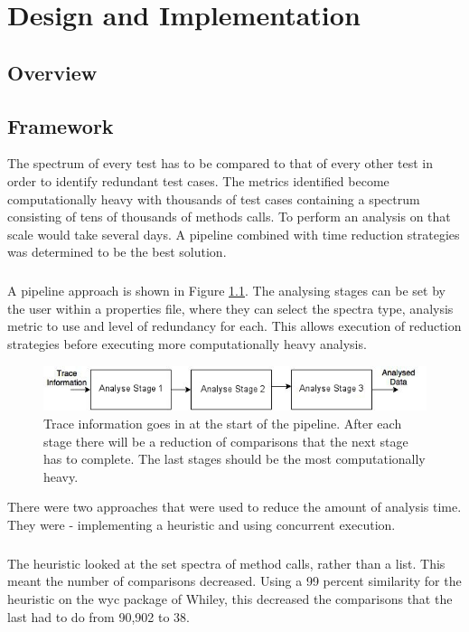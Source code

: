 \chapter{Design and Implementation}\label{C:workdone}

\section{Overview}


\section{Framework}
\label{S:framework}

The spectrum of every test has to be compared to that of every other test in order to identify redundant test cases. The metrics identified become computationally heavy with thousands of test cases containing a spectrum consisting of tens of thousands of methods calls. To perform an analysis on that scale would take several days. A pipeline combined with time reduction strategies was determined to be the best solution.
\paragraph{}
A pipeline approach is shown in Figure \ref{fig:pipeline}. The analysing stages can be set by the user within a properties file, where they can select the spectra type, analysis metric to use and level of redundancy for each. This allows execution of reduction strategies before executing more computationally heavy analysis.

\begin{figure}[h]
\includegraphics[width=\textwidth]{Pipeline.jpg}
\caption{Trace information goes in at the start of the pipeline. After each stage there will be a reduction of comparisons that the next stage has to complete. The last stages should be the most computationally heavy.}
\label{fig:pipeline}
\end{figure}

There were two approaches that were used to reduce the amount of analysis time. They were - implementing a heuristic and using concurrent execution. 
\paragraph{}
The heuristic looked at the set spectra of method calls, rather than a list. This meant the number of comparisons decreased. Using a 99 percent similarity for the heuristic on the wyc package of Whiley, this decreased the comparisons that the last had to do from 90,902 to 38.

